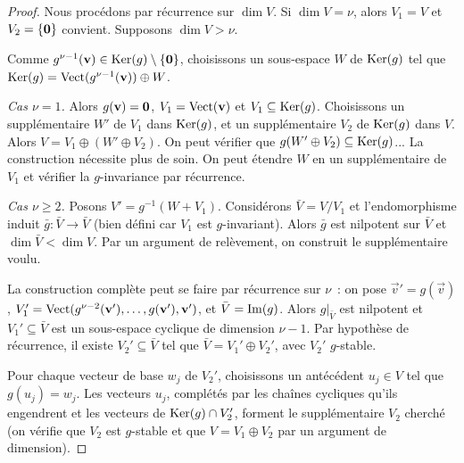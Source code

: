 \begin{proof}
  Nous procédons par récurrence sur $\dim V$. Si $\dim V=\nu$, alors
  $V_1=V$ et $V_2=\left\{\mathbf{0}\right\}$ convient. Supposons $\dim V>\nu$.

  Comme $g^{\nu-1}(\mathbf{v})\in\operatorname{Ker}(g)\setminus\left\{\mathbf{0}\right\}$,
  choisissons un sous-espace $W$ de $\operatorname{Ker}(g)$ tel que
  $\operatorname{Ker}(g)=\operatorname{Vect}(g^{\nu-1}(\mathbf{v}))\oplus W$.

  \emph{Cas $\nu=1$.} Alors $g(\mathbf{v})=\mathbf{0}$, $V_1=\operatorname{Vect}(\mathbf{v})$
  et $V_1\subseteq\operatorname{Ker}(g)$. Choisissons un supplémentaire $W'$ de $V_1$
  dans $\operatorname{Ker}(g)$, et un supplémentaire $V_2$ de $\operatorname{Ker}(g)$ dans $V$.
  Alors $V=V_1\oplus(W'\oplus V_2)$. On peut vérifier que
  $g(W'\oplus V_2)\subseteq\operatorname{Ker}(g)$... La construction nécessite plus de
  soin. On peut étendre $W$ en un supplémentaire de $V_1$ et vérifier
  la $g$-invariance par récurrence.

  \emph{Cas $\nu\geq 2$.} Posons $V'=g^{-1}(W+V_1)$. Considérons
  $\bar{V}=V/V_1$ et l'endomorphisme induit $\bar{g}\colon\bar{V}\to\bar{V}$
  (bien défini car $V_1$ est $g$-invariant). Alors $\bar{g}$ est
  nilpotent sur $\bar{V}$ et $\dim\bar{V}<\dim V$. Par un argument de
  relèvement, on construit le supplémentaire voulu.

  La construction complète peut se faire par récurrence sur $\nu$~: on
  pose $\vec{v}'=g(\vec{v})$, $V_1'=\operatorname{Vect}(g^{\nu-2}(\mathbf{v}'),\ldots,
  g(\mathbf{v}'),\mathbf{v}')$, et $\bar{V}=\operatorname{Im}(g)$. Alors $g|_{\bar{V}}$
  est nilpotent et $V_1'\subseteq\bar{V}$ est un sous-espace cyclique
  de dimension $\nu-1$. Par hypothèse de récurrence, il existe
  $V_2'\subseteq\bar{V}$ tel que $\bar{V}=V_1'\oplus V_2'$, avec $V_2'$
  $g$-stable.

  Pour chaque vecteur de base $w_j$ de $V_2'$, choisissons un
  antécédent $u_j\in V$ tel que $g(u_j)=w_j$. Les vecteurs $u_j$,
  complétés par les chaînes cycliques qu'ils engendrent et les vecteurs
  de $\operatorname{Ker}(g)\cap V_2'$, forment le supplémentaire $V_2$ cherché (on
  vérifie que $V_2$ est $g$-stable et que $V=V_1\oplus V_2$ par un
  argument de dimension).
\end{proof}

